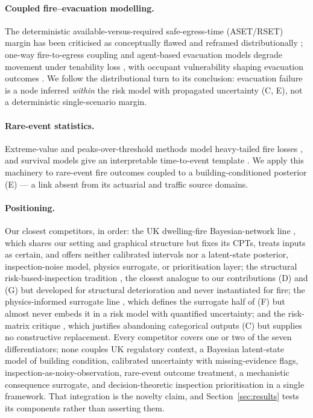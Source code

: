 \paragraph{Coupled fire--evacuation modelling.}
The deterministic available-versus-required safe-egress-time (ASET/RSET) margin
has been criticised as conceptually flawed \citep{babrauskas2010} and reframed
distributionally \citep{schroeder2020}; one-way fire-to-egress coupling and
agent-based evacuation models degrade movement under tenability loss
\citep{cheong2021,wang2025medbuild}, with occupant vulnerability shaping
evacuation outcomes \citep{tancogne2016}. We follow the distributional turn to
its conclusion: evacuation failure is a node inferred \emph{within} the risk
model with propagated uncertainty (C, E), not a deterministic single-scenario
margin.

\paragraph{Rare-event statistics.}
Extreme-value and peaks-over-threshold methods model heavy-tailed fire losses
\citep{ramachandran1974,mcneil1997,embrechts1997}, and survival models give an
interpretable time-to-event template \citep{kalair2021}. We apply this
machinery to rare-event fire outcomes coupled to a building-conditioned
posterior (E) --- a link absent from its actuarial and traffic source domains.

\paragraph{Positioning.}
Our closest competitors, in order: the UK dwelling-fire Bayesian-network line
\citep{matellini2018threepart,matellini2013}, which shares our setting and
graphical structure but fixes its CPTs, treats inputs as certain, and offers
neither calibrated intervals nor a latent-state posterior, inspection-noise
model, physics surrogate, or prioritisation layer; the structural
risk-based-inspection tradition \citep{straub2005,luque2019}, the closest
analogue to our contributions (D) and (G) but developed for structural
deterioration and never instantiated for fire; the physics-informed surrogate
line \citep{yarmohammadian2025pism,naser2021}, which defines the surrogate half
of (F) but almost never embeds it in a risk model with quantified uncertainty;
and the risk-matrix critique \citep{cox2008,thomas2014}, which justifies
abandoning categorical outputs (C) but supplies no constructive replacement.
Every competitor covers one or two of the seven differentiators; none couples
UK regulatory context, a Bayesian latent-state model of building condition,
calibrated uncertainty with missing-evidence flags,
inspection-as-noisy-observation, rare-event outcome treatment, a
mechanistic consequence surrogate, and decision-theoretic inspection
prioritisation in a single framework. That integration is the novelty claim,
and Section~\ref{sec:results} tests its components rather than asserting them.
